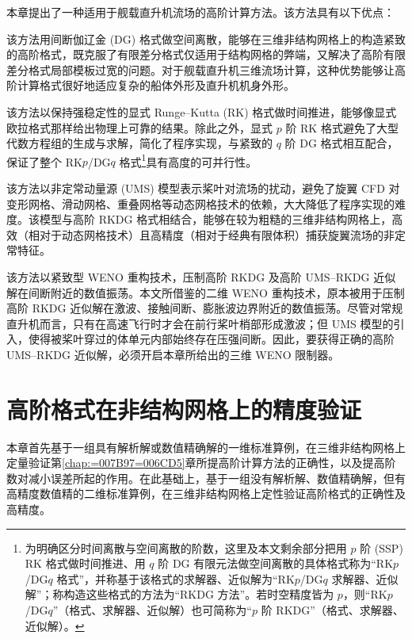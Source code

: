 本章提出了一种适用于舰载直升机流场的高阶计算方法。该方法具有以下优点：
\begin{description}[wide]
\item [{能够处理几何外形复杂的边界}] 该方法用间断伽辽金 (DG) 格式做空间离散，能够在三维非结构网格上的构造紧致的高阶格式，既克服了有限差分格式仅适用于结构网格的弊端，又解决了高阶有限差分格式局部模板过宽的问题。对于舰载直升机三维流场计算，这种优势能够让高阶计算格式很好地适应复杂的船体外形及直升机机身外形。
\item [{能够保持数值解的强稳定性}] 该方法以保持强稳定性的显式 Runge–Kutta (RK) 格式做时间推进，能够像显式欧拉格式那样给出物理上可靠的结果。除此之外，显式
$p$ 阶 RK 格式避免了大型代数方程组的生成与求解，简化了程序实现，与紧致的 $q$ 阶 DG 格式相互配合，保证了整个 RK$p$/DG$q$
格式\footnote{为明确区分时间离散与空间离散的阶数，这里及本文剩余部分把用 $p$ 阶 (SSP) RK 格式做时间推进、用 $q$ 阶 DG
有限元法做空间离散的具体格式称为“RK$p$/DG$q$ 格式”，并称基于该格式的求解器、近似解为“RK$p$/DG$q$
求解器、近似解”；称构造这些格式的方法为“RKDG 方法”。若时空精度皆为 $p$，则“RK$p$/DG$q$”（格式、求解器、近似解）也可简称为“$p$
阶 RKDG”（格式、求解器、近似解）。}具有高度的可并行性。
\item [{避免了对动态网格技术的依赖}] 该方法以非定常动量源 (UMS) 模型表示桨叶对流场的扰动，避免了旋翼 CFD 对变形网格、滑动网格、重叠网格等动态网格技术的依赖，大大降低了程序实现的难度。该模型与高阶
RKDG 格式相结合，能够在较为粗糙的三维非结构网格上，高效（相对于动态网格技术）且高精度（相对于经典有限体积）捕获旋翼流场的非定常特征。
\item [{压制了高阶近似解的数值振荡}] 该方法以紧致型 WENO 重构技术，压制高阶 RKDG 及高阶 UMS–RKDG 近似解在间断附近的数值振荡。本文所借鉴的二维
WENO 重构技术，原本被用于压制高阶 RKDG 近似解在激波、接触间断、膨胀波边界附近的数值振荡。尽管对常规直升机而言，只有在高速飞行时才会在前行桨叶梢部形成激波；但
UMS 模型的引入，使得被桨叶穿过的体单元内部始终存在压强间断。因此，要获得正确的高阶 UMS–RKDG 近似解，必须开启本章所给出的三维
WENO 限制器。
\end{description}


\chapter{高阶格式在非结构网格上的精度验证\label{chap:=009A8C=008BC1}}

本章首先基于一组具有解析解或数值精确解的一维标准算例，在三维非结构网格上定量验证第\ref{chap:=007B97=006CD5}章所提高阶计算方法的正确性，以及提高阶数对减小误差所起的作用。在此基础上，基于一组没有解析解、数值精确解，但有高精度数值精的二维标准算例，在三维非结构网格上定性验证高阶格式的正确性及高精度。

